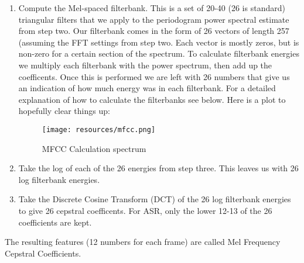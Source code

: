 \begin{enumerate}[1)]
        \item  Compute the Mel-spaced filterbank. This is a set of 20-40 (26 is standard) triangular filters that we apply to the
                periodogram power spectral estimate from step two. Our filterbank comes in the form of 26 vectors of length 257
                (assuming the FFT settings from step two. Each vector is mostly zeros, but is non-zero for a certain section of the
                spectrum. To calculate filterbank energies we multiply each filterbank with the power spectrum, then add up the
                coefficents. Once this is performed we are left with 26 numbers that give us an indication of how much energy was
                in each filterbank. For a detailed explanation of how to calculate the filterbanks see below. Here is a plot to
                hopefully clear things up:
                \begin{figure}[h]
                        \centering
                        \texttt{[image: resources/mfcc.png]}
                        \caption{MFCC Calculation spectrum}
                        \label{fig:figure5}
                \end{figure}
        \item Take the log of each of the 26 energies from step three. This leaves us with 26 log filterbank energies. 
        \item Take the Discrete Cosine Transform (DCT) of the 26 log filterbank energies to give 26 cepstral coefficents. For
                ASR, only the lower 12-13 of the 26 coefficients are kept.
\end{enumerate}

The resulting features (12 numbers for each frame) are called Mel Frequency Cepstral Coefficients.

